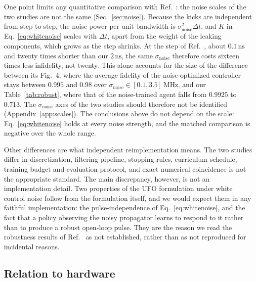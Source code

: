 \documentclass[aps,prx,twocolumn,superscriptaddress,nofootinbib,amsmath,amssymb,floatfix]{revtex4-2}
\newcommand{\snoise}{\sigma_{\mathrm{noise}}}
\newcommand{\ns}{\,\mathrm{ns}}
\newcommand{\MHz}{\,\mathrm{MHz}}
\begin{document}
One point limits any quantitative comparison with Ref.~\cite{Niu2019}: the noise scales of the two studies
are not the same (Sec.~\ref{sec:noise}). Because the kicks are independent from step to step, the noise
power per unit bandwidth is $\snoise^2\Delta t$, and $K$ in Eq.~\eqref{eq:whitenoise} scales with
$\Delta t$, apart from the weight of the leaking components, which grows as the step shrinks. At the step
of Ref.~\cite{Niu2019}, about $0.1\ns$ and twenty times shorter than our $2\ns$, the same $\snoise$
therefore costs sixteen times less infidelity, not twenty. This alone accounts for the size of the difference between its
Fig.~4, where the average fidelity of the noise-optimized controller stays between $0.995$ and $0.98$ over
$\snoise\in[0.1,3.5]\MHz$, and our Table~\ref{tab:robust}, where that of the noise-trained agent falls from
$0.9925$ to $0.713$. The $\snoise$ axes of the two studies should therefore not be identified
(Appendix~\ref{app:scales}). The conclusions above do not depend on the scale: Eq.~\eqref{eq:whitenoise}
holds at every noise strength, and the matched comparison is negative over the whole range.

Other differences are what independent reimplementation means. The two studies differ in discretization,
filtering pipeline, stopping rules, curriculum schedule, training budget and evaluation protocol, and
exact numerical coincidence is not the appropriate standard. The main discrepancy, however, is not an
implementation detail. Two properties of the UFO formulation under white control noise follow from the
formulation itself, and we would expect them in any faithful implementation: the pulse-independence of
Eq.~\eqref{eq:whitenoise}, and the fact that a policy observing the noisy propagator learns to respond to
it rather than to produce a robust open-loop pulse. They are the reason we read the robustness results of
Ref.~\cite{Niu2019} as not established, rather than as not reproduced for incidental reasons.

\subsection{Relation to hardware}
\label{sec:hardware}
\end{document}
